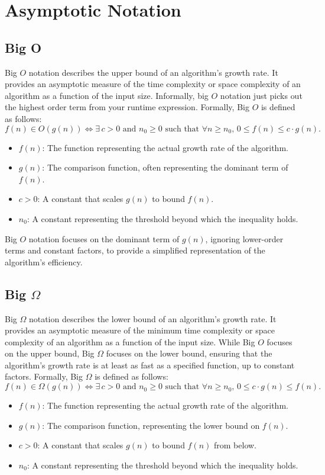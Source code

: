 \section{Asymptotic Notation}

\subsection{Big O}
Big $O$ notation describes the upper bound 
of an algorithm's growth rate. It provides an 
asymptotic measure of the time complexity or 
space complexity of an algorithm as a function of 
the input size. Informally, big $O$ notation
just picks out the highest 
order term from your runtime expression. 
Formally, Big $O$ is defined as follows:
\[
f(n) \in O(g(n)) \iff \exists \, c > 0 \text{ and } n_0 \geq 0 \text{ such that } \forall n \geq n_0, \, 0 \leq f(n) \leq c \cdot g(n).
\]
\begin{itemize}
    \item $f(n)$: The function representing the actual growth rate of the algorithm.
    \item $g(n)$: The comparison function, often representing the dominant term of $f(n)$.
    \item $c > 0$: A constant that scales $g(n)$ to bound $f(n)$.
    \item $n_0$: A constant representing the threshold beyond which the inequality holds.
\end{itemize}

Big $O$ notation focuses on the dominant term of $g(n)$, 
ignoring lower-order terms and constant factors, to provide a 
simplified representation of the algorithm's efficiency.

\subsection{Big $\Omega$}
Big $\Omega$ notation describes the lower bound 
of an algorithm's growth rate. It provides an 
asymptotic measure of the minimum time complexity or 
space complexity of an algorithm as a function of 
the input size. While Big $O$ focuses on the upper bound, 
Big $\Omega$ focuses on the lower bound, ensuring that the 
algorithm's growth rate is at least as fast as a specified 
function, up to constant factors. Formally, Big $\Omega$ is defined as follows:
\[
f(n) \in \Omega(g(n)) \iff \exists \, c > 0 \text{ and } n_0 \geq 0 \text{ such that } \forall n \geq n_0, \, 0 \leq c \cdot g(n) \leq f(n).
\]
\begin{itemize}
    \item $f(n)$: The function representing the actual growth rate of the algorithm.
    \item $g(n)$: The comparison function, representing the lower bound on $f(n)$.
    \item $c > 0$: A constant that scales $g(n)$ to bound $f(n)$ from below.
    \item $n_0$: A constant representing the threshold beyond which the inequality holds.
\end{itemize}

